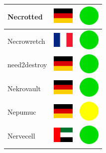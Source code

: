\documentclass[12pt, a4paper, twoside]{report}
\begin{document}
\begin{center}
\begin{longtable}{|p{5cm}|p{2cm}|p{2cm}|}
 Necrotted                                                  & \includegraphics[width=1cm]{../4x3/de} &   \includegraphics[width=1cm]{../likes/y} \\ \hline
 Necrowretch                                                & \includegraphics[width=1cm]{../4x3/fr} &   \includegraphics[width=1cm]{../likes/y} \\ \hline
 need2destroy                                               & \includegraphics[width=1cm]{../4x3/de} &   \includegraphics[width=1cm]{../likes/y} \\ \hline
 Nekrovault                                                 & \includegraphics[width=1cm]{../4x3/de} &   \includegraphics[width=1cm]{../likes/y} \\ \hline
 Nepumuc                                                    & \includegraphics[width=1cm]{../4x3/de} &   \includegraphics[width=1cm]{../likes/m} \\ \hline
 Nervecell                                                  & \includegraphics[width=1cm]{../4x3/ae} &   \includegraphics[width=1cm]{../likes/y} \\ \hline

\end{longtable}
\end{center}
\end{document}
